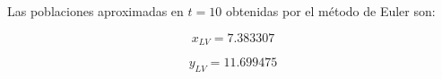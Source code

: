 \documentclass{article}
\begin{document}
Las poblaciones aproximadas en $t = 10$ obtenidas por el m\'etodo de Euler son:

\begin{equation}
    x_{LV} =
    7.383307
    \label{eq:res:xlv}
\end{equation}

\begin{equation}
    y_{LV} =
    11.699475
    \label{eq:res:ylv}
\end{equation}
\end{document}
